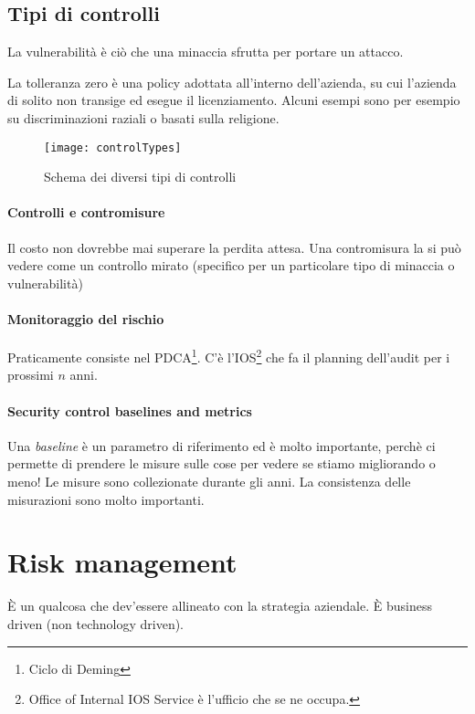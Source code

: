 \subsection{Tipi di controlli}

La vulnerabilità è ciò che una minaccia sfrutta per portare un attacco.


La tolleranza zero è una policy adottata all'interno dell'azienda, su cui
l'azienda di solito non transige ed esegue il licenziamento. Alcuni esempi sono
per esempio su discriminazioni raziali o basati sulla religione.

\begin{figure}[H]
 \centering
 \texttt{[image: controlTypes]}
 \caption{Schema dei diversi tipi di controlli}
\end{figure}



\paragraph*{Controlli e contromisure}

Il costo non dovrebbe mai superare la perdita attesa.
Una contromisura la si pu\`o vedere come un controllo mirato (specifico per un
particolare tipo di minaccia o vulnerabilità)


\paragraph*{Monitoraggio del rischio}

Praticamente consiste nel PDCA\footnote{Ciclo di Deming}.
C'è l'IOS\footnote{Office of Internal IOS Service è l'ufficio che se ne occupa.}
che fa il planning dell'audit per i prossimi $n$ anni.


\paragraph*{Security control baselines and metrics}

Una \textit{baseline} è un parametro di riferimento ed è molto importante,
perchè ci permette di prendere le misure sulle cose per vedere se stiamo
migliorando o meno!
Le misure sono collezionate durante gli anni. La consistenza delle misurazioni
sono molto importanti.

\section{Risk management}
È un qualcosa che dev'essere allineato con la strategia aziendale.
È business driven (non technology driven).


